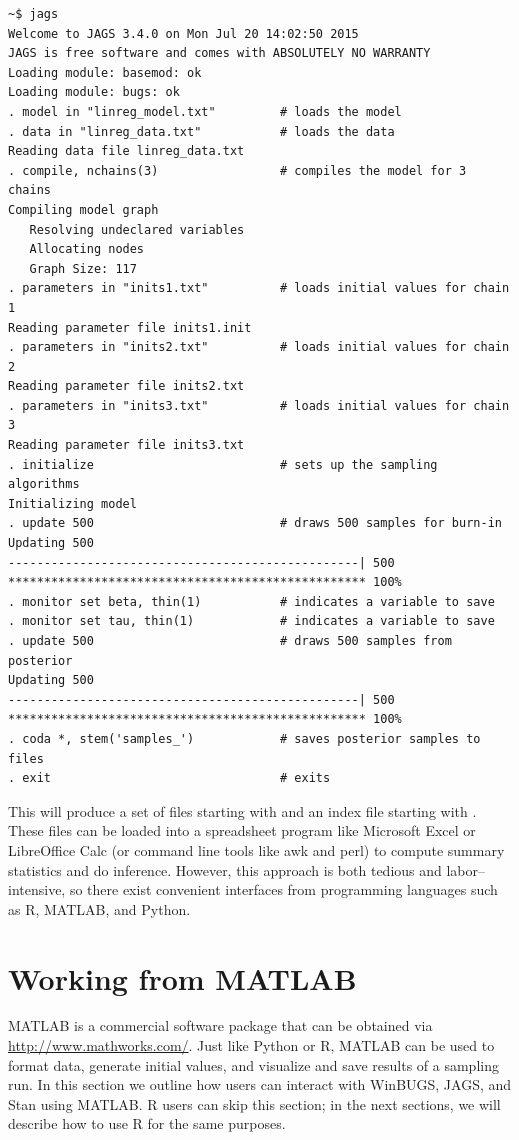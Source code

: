 \begin{lstlisting}
~$ jags
Welcome to JAGS 3.4.0 on Mon Jul 20 14:02:50 2015
JAGS is free software and comes with ABSOLUTELY NO WARRANTY
Loading module: basemod: ok
Loading module: bugs: ok
. model in "linreg_model.txt"         # loads the model
. data in "linreg_data.txt"           # loads the data
Reading data file linreg_data.txt
. compile, nchains(3)                 # compiles the model for 3 chains
Compiling model graph
   Resolving undeclared variables
   Allocating nodes
   Graph Size: 117
. parameters in "inits1.txt"          # loads initial values for chain 1
Reading parameter file inits1.init
. parameters in "inits2.txt"          # loads initial values for chain 2
Reading parameter file inits2.txt
. parameters in "inits3.txt"          # loads initial values for chain 3
Reading parameter file inits3.txt
. initialize                          # sets up the sampling algorithms
Initializing model
. update 500                          # draws 500 samples for burn-in
Updating 500
-------------------------------------------------| 500
************************************************** 100%
. monitor set beta, thin(1)           # indicates a variable to save
. monitor set tau, thin(1)            # indicates a variable to save
. update 500                          # draws 500 samples from posterior
Updating 500
-------------------------------------------------| 500
************************************************** 100%
. coda *, stem('samples_')            # saves posterior samples to files
. exit                                # exits
\end{lstlisting}

This will produce a set of files starting with  and an index file starting with . These files can be loaded into a spreadsheet program like Microsoft Excel or LibreOffice Calc (or command line tools like awk and perl) to compute summary statistics and do inference. However, this approach is both tedious and labor--intensive, so there exist convenient interfaces from programming languages such as R, MATLAB, and Python.



\section{Working from MATLAB}

MATLAB is a commercial software package that can be obtained via \url{http://www.mathworks.com/}. Just like Python or R, MATLAB can be used to format data, generate initial values, and visualize and save results of a sampling run. In this section we outline how users can interact with WinBUGS, JAGS, and Stan using MATLAB. R users can skip this section; in the next sections, we will describe how to use R for the same purposes.

